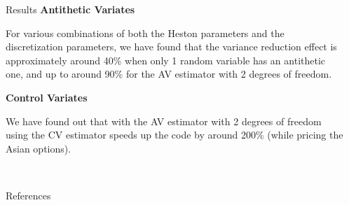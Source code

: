 \documentclass[]{beamer}
\begin{document}
\begin{frame}[t]
\begin{columns}[t]
\begin{column}{\onecolwid}
\begin{block}{Results}
        \textbf{Antithetic Variates}
            
        For various combinations of both the Heston parameters and the discretization parameters, we
        have found that the variance reduction effect is approximately around 40\% when only 1 random variable has an antithetic one, and up to around 90\% for the AV estimator with 2 degrees of freedom.


        \textbf{Control Variates}
        
        We have found out that with the AV estimator with 2 degrees of freedom using the CV estimator speeds up the code by around 200\% (while pricing the Asian options).
    \end{block}
    
    \

    
    \begin{block}{References}
    
    \printbibliography
    
    \end{block}
    
    \end{column} %
    
    \begin{column}{\sepwid}\end{column} %
    
    \end{columns} %
        
    \end{frame} %
\end{document}
